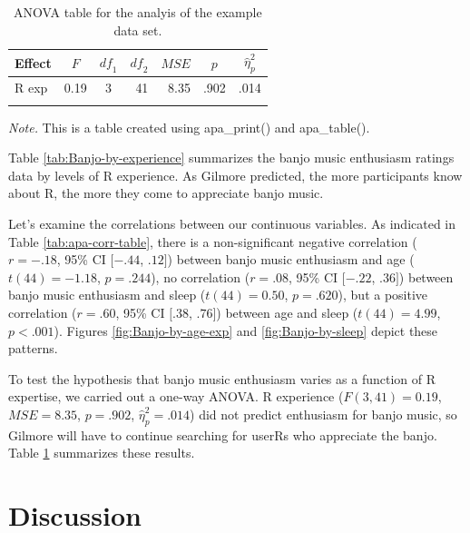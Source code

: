 \documentclass[english,man]{apa6}
\theoremstyle{definition}
\theoremstyle{definition}
\theoremstyle{definition}
\theoremstyle{remark}
\begin{document}
\begin{table}[tbp]
\begin{center}
\begin{threeparttable}
\caption{\label{tab:Banjo-aov-table}ANOVA table for the analyis of the example data set.}
\begin{tabular}{lrcrrrl}
\toprule
Effect & \multicolumn{1}{c}{$F$} & \multicolumn{1}{c}{$\mathit{df}_1$} & \multicolumn{1}{c}{$\mathit{df}_2$} & \multicolumn{1}{c}{$\mathit{MSE}$} & \multicolumn{1}{c}{$p$} & \multicolumn{1}{c}{$\hat{\eta}^2_p$}\\
\midrule
R exp & 0.19 & 3 & 41 & 8.35 & .902 & .014\\
\bottomrule
\addlinespace
\end{tabular}
\begin{tablenotes}[para]
\textit{Note.} This is a table created using apa\_print() and apa\_table().
\end{tablenotes}
\end{threeparttable}
\end{center}
\end{table}

Table \ref{tab:Banjo-by-experience} summarizes the banjo music
enthusiasm ratings data by levels of R experience. As Gilmore predicted,
the more participants know about R, the more they come to appreciate
banjo music.

Let's examine the correlations between our continuous variables. As
indicated in Table \ref{tab:apa-corr-table}, there is a non-significant
negative correlation (\(r = -.18\), 95\% CI \([-.44\), \(.12]\)) between
banjo music enthusiasm and age (\(t(44) = -1.18\), \(p = .244\)), no
correlation (\(r = .08\), 95\% CI \([-.22\), \(.36]\)) between banjo
music enthusiasm and sleep (\(t(44) = 0.50\), \(p = .620\)), but a
positive correlation (\(r = .60\), 95\% CI \([.38\), \(.76]\)) between
age and sleep (\(t(44) = 4.99\), \(p < .001\)). Figures
\ref{fig:Banjo-by-age-exp} and \ref{fig:Banjo-by-sleep} depict these
patterns.

To test the hypothesis that banjo music enthusiasm varies as a function
of R expertise, we carried out a one-way ANOVA. R experience
(\(F(3, 41) = 0.19\), \(\mathit{MSE} = 8.35\), \(p = .902\),
\(\hat{\eta}^2_p = .014\)) did not predict enthusiasm for banjo music,
so Gilmore will have to continue searching for userRs who appreciate the
banjo. Table \ref{tab:Banjo-aov-table} summarizes these results.

\section{Discussion}\label{discussion}
\end{document}
